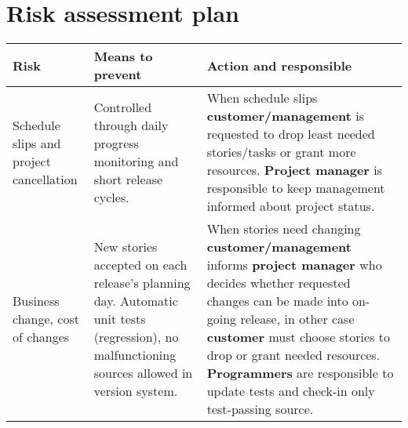 \section{Risk assessment plan}
\begin{adjustbox}{center}
\begin{tabular}{ p{0.1\paperwidth} | p{0.25\paperwidth} | p{0.3\paperwidth} }
    Risk & Means to prevent & Action and responsible \\ \hline
    Schedule slips and project cancellation
    & Controlled through daily progress monitoring and short release cycles.
    & When schedule slips \textbf{customer/management} is requested to drop least needed stories/tasks or grant more resources. \textbf{Project manager} is responsible to keep management informed about project status. \\ \hline
    
    Business change, cost of changes
    & New stories accepted on each release’s planning day. Automatic unit tests (regression), no malfunctioning sources allowed in version system.
    & When stories need changing \textbf{customer/management} informs \textbf{project manager} who decides whether requested changes can be made into on-going release, in other case \textbf{customer} must choose stories to drop or grant needed resources. \textbf{Programmers} are responsible to update tests and check-in only test-passing source. \\ \hline
    
\end{tabular}
\end{adjustbox}